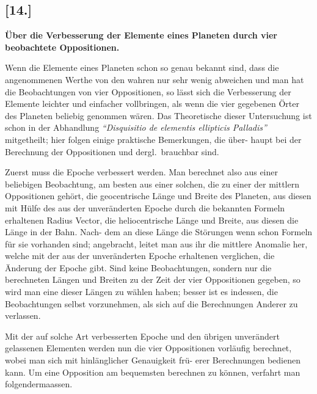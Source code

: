 \documentclass[12pt,a4paper]{article}
\begin{document}
\newpage

\subsection*{[14.]}
\textbf{\"Uber die Verbesserung der Elemente eines Planeten
durch vier beobachtete Oppositionen.}

Wenn die Elemente eines Planeten schon so genau bekannt sind, dass die angenommenen Werthe
von den wahren nur sehr wenig abweichen und man hat die Beobachtungen von vier Oppositionen, so l\"asst
sich die Verbesserung der Elemente leichter und einfacher vollbringen, als wenn die vier gegebenen \"Orter
des Planeten beliebig genommen w\"aren. Das Theoretische dieser Untersuchung ist schon in der Abhandlung
\textit{``Disquisitio de elementis ellipticis Palladis''} mitgetheilt; hier folgen einige praktische Bemerkungen, die \"uber-
haupt bei der Berechnung der Oppositionen und dergl.~brauchbar sind.

Zuerst muss die Epoche verbessert werden. Man berechnet also aus einer beliebigen Beobachtung,
am besten aus einer solchen, die zu einer der mittlern Oppositionen geh\"ort, die geocentrische L\"ange und
Breite des Planeten, aus diesen mit H\"ulfe des aus der unver\"anderten Epoche durch die bekannten Formeln
erhaltenen Radius Vector, die heliocentrische L\"ange und Breite, aus diesen die L\"ange in der Bahn. Nach-
dem an diese L\"ange die St\"orungen wenn schon Formeln f\"ur sie vorhanden sind; angebracht, leitet man
aus ihr die mittlere Anomalie her, welche mit der aus der unver\"anderten Epoche erhaltenen verglichen, die
\"Anderung der Epoche gibt. Sind keine Beobachtungen, sondern nur die berechneten L\"angen und Breiten
zu der Zeit der vier Oppositionen gegeben, so wird man eine dieser L\"angen zu w\"ahlen haben; besser ist
es indessen, die Beobachtungen selbst vorzunehmen, als sich auf die Berechnungen Anderer zu verlassen.

Mit der auf solche Art verbesserten Epoche und den \"ubrigen unver\"andert gelassenen Elementen
werden nun die vier Oppositionen vorl\"aufig berechnet, wobei man sich mit hinl\"anglicher Genauigkeit fr\"u-
erer Berechnungen bedienen kann. Um eine Opposition am bequemsten berechnen zu k\"onnen, verfahrt
man folgendermaassen.
\end{document}
